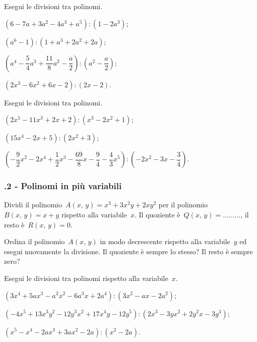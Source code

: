 \begin{esercizio}[\Ast]
\label{ese:12.4}
Esegui le divisioni tra polinomi.
 \begin{enumeratea}
 \item $\left(6-7a+3a^{2}-4a^{3}+a^{5}\right):\left(1-2a^{3}\right)$;
 \item $(a^{6}-1):(1+a^{3}+2a^{2}+2a)$;
 \item $\left(a^{4}-\dfrac{5}{4}a^{3}+\dfrac{11}{8}a^{2}-\dfrac{a}{2}\right):\left(a^{2}-\dfrac{a}{2}\right)$;
 \item $\left(2x^{3}-6x^{2}+6x-2\right):\left(2x-2\right)$.
 \end{enumeratea}
\end{esercizio}

\begin{esercizio}
\label{ese:12.5}
Esegui le divisioni tra polinomi.
 \begin{enumeratea}
 \item $\left(2x^{5}-11x^{3}+2x+2\right):\left(x^{3}-2x^{2}+1\right)$;
 \item $\left(15x^{4}-2x+5\right):\left(2x^{2}+3\right)$;
 \item $\left(-{\dfrac{9}{2}}x^{2}-2x^{4}+\dfrac{1}{2}x^{3}-\dfrac{69}{8}x-\dfrac{9}{4}-\dfrac{4}{3}x^{5}\right):\left(-2x^{2}-3x-\dfrac{3}{4}\right)$.
 \end{enumeratea}
\end{esercizio}

\subsubsection*{\thechapter.2 - Polinomi in più variabili}

\begin{esercizio}
\label{ese:12.6}
Dividi il polinomio~$A(x\text{,~}y)=x^{3}+3x^{2}y+2xy^{2}$ per il polinomio~$B(x\text{,~}y)=x+y$ rispetto alla variabile~$x$.
Il quoziente è~$Q(x\text{,~}y)=\ldots \ldots \ldots$, il resto è~$R(x\text{,~}y)=0$.

Ordina il polinomio~$A(x\text{,~}y)$ in modo decrescente rispetto alla variabile~$y$ ed esegui
nuovamente la divisione. Il quoziente è sempre lo stesso? Il resto è sempre zero?
\end{esercizio}

\begin{esercizio}
\label{ese:12.7}
Esegui le divisioni tra polinomi rispetto alla variabile~$x$.
 \begin{enumeratea}
 \item $\left(3x^{4}+5ax^{3}-a^{2}x^{2}-6a^{3}x+2a^{4}\right):\left(3x^{2}-ax-2a^{2}\right)$;
 \item $\left(-4x^{5}+13x^{3}y^{2}-12y^{3}x^{2}+17x^{4}y-12y^{5}\right):\left(2x^{3}-3yx^{2}+2y^{2}x-3y^{3}\right)$;
 \item $\left(x^{5}-x^{4}-2ax^{3}+3ax^{2}-2a\right):\left(x^{2}-2a\right)$.
 \end{enumeratea}
\end{esercizio}

